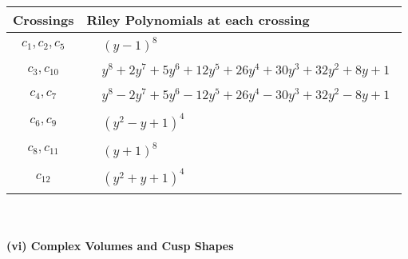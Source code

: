 \documentclass[1p]{elsarticle_modified}
\theoremstyle{definition}
\begin{document}
\begin{tabular}{m{50pt}|m{274pt}}
Crossings & \hspace{64pt}Riley Polynomials at each crossing \\
\hline $$\begin{aligned}c_{1},c_{2},c_{5}\end{aligned}$$&$\begin{aligned}
&(y-1)^8
\end{aligned}$\\
\hline $$\begin{aligned}c_{3},c_{10}\end{aligned}$$&$\begin{aligned}
&y^8+2 y^7+5 y^6+12 y^5+26 y^4+30 y^3+32 y^2+8 y+1
\end{aligned}$\\
\hline $$\begin{aligned}c_{4},c_{7}\end{aligned}$$&$\begin{aligned}
&y^8-2 y^7+5 y^6-12 y^5+26 y^4-30 y^3+32 y^2-8 y+1
\end{aligned}$\\
\hline $$\begin{aligned}c_{6},c_{9}\end{aligned}$$&$\begin{aligned}
&(y^2- y+1)^4
\end{aligned}$\\
\hline $$\begin{aligned}c_{8},c_{11}\end{aligned}$$&$\begin{aligned}
&(y+1)^8
\end{aligned}$\\
\hline $$\begin{aligned}c_{12}\end{aligned}$$&$\begin{aligned}
&(y^2+y+1)^4
\end{aligned}$\\
\hline
\end{tabular}\\~\\
\newpage\flushleft \textbf{(vi) Complex Volumes and Cusp Shapes}
\end{document}
